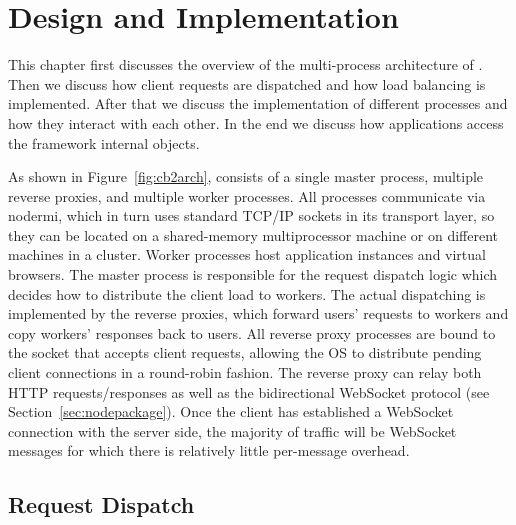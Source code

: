 \chapter{Design and Implementation}
\label{ch:impl}

This chapter first discusses the overview of the multi-process architecture of \cbtwo.
Then we discuss how client requests are dispatched and how load balancing is implemented.
After that we discuss the implementation of different \cbtwo processes and how they interact
with each other.
In the end we discuss how \cb applications access the framework internal objects.



As shown in Figure~\ref{fig:cb2arch}, \cbtwo consists of a
single master process, multiple reverse proxies, and multiple worker
processes. All processes communicate via nodermi, which in turn uses standard TCP/IP 
sockets in its transport layer, so they can
be located on a shared-memory multiprocessor machine or on different machines in a cluster. 
Worker processes host application instances and virtual browsers. The master process is responsible for
the request dispatch logic which decides how to distribute the client load to
workers. The actual dispatching is implemented by the reverse proxies, which
forward users' requests to workers and copy workers' responses back to users.
All reverse proxy processes are bound to the socket that accepts client
requests, allowing the OS to distribute pending client connections in a round-robin 
fashion.
The reverse proxy can relay both HTTP requests/responses as
well as the bidirectional WebSocket protocol (see Section~\ref{sec:nodepackage}).
Once the client has established a WebSocket connection with
the server side, the majority of traffic will be WebSocket
messages for which there is relatively little per-message overhead.

\newarchitectureoverview{}



\section{Request Dispatch}
\label{sec:reqdis}

